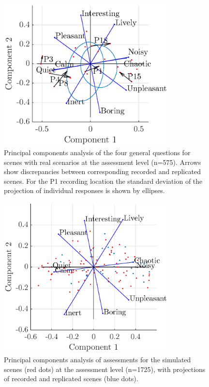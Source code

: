 \documentclass[11pt,a4paper]{article}
\begin{document}
\begin{figure}[h]
    \centering
    \includegraphics[width=0.8\textwidth]{figures/pca_p1.eps}
    \caption{Principal components analysis of the four general questions for scenes with real scenarios at the assessment level (n=575). Arrows show discrepancies between corresponding recorded and replicated scenes. For the P1 recording location the standard deviation of the projection of individual responses is shown by ellipses.}\label{fig:pspace_rec}
\end{figure}
\begin{figure}[h]
    \centering
    \includegraphics[width=0.8\textwidth]{figures/pca_sim.eps}
    \caption{Principal components analysis of assessments for the simulated scenes (red dots) at the assessment level (n=1725), with projections of recorded and replicated scenes (blue dots).}\label{fig:pspace_sim}
\end{figure}
\end{document}
